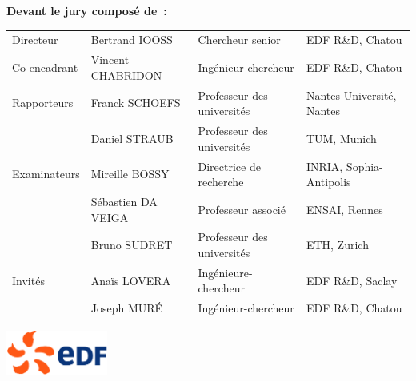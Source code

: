 {\begin{adjustwidth}{-8mm}{-8mm}
\noindent
\textbf{Devant le jury composé de~:}\\
\begin{tabular}{llll}
  Directeur       & Bertrand IOOSS      & Chercheur senior & EDF R\&D, Chatou \\
  Co-encadrant    & Vincent CHABRIDON   & Ingénieur-chercheur        & EDF R\&D, Chatou \\
  Rapporteurs     & Franck SCHOEFS      & Professeur des universités & Nantes Université, Nantes\\
                  & Daniel STRAUB       & Professeur des universités & TUM, Munich\\
  Examinateurs    & Mireille BOSSY      & Directrice de recherche    & INRIA, Sophia-Antipolis\\
                  & Sébastien DA VEIGA  & Professeur associé         & ENSAI, Rennes\\
                  & Bruno SUDRET        & Professeur des universités & ETH, Zurich \\ 
  Invités         & Ana\"is LOVERA      & Ingénieure-chercheur       & EDF R\&D, Saclay\\
                  & Joseph MUR\'E       & Ingénieur-chercheur        & EDF R\&D, Chatou \\
\end{tabular}
\end{adjustwidth}

\vfill
\begin{center}
  \includegraphics[width=0.25\textwidth]{classes/logo_EDF.png}
\end{center}
}